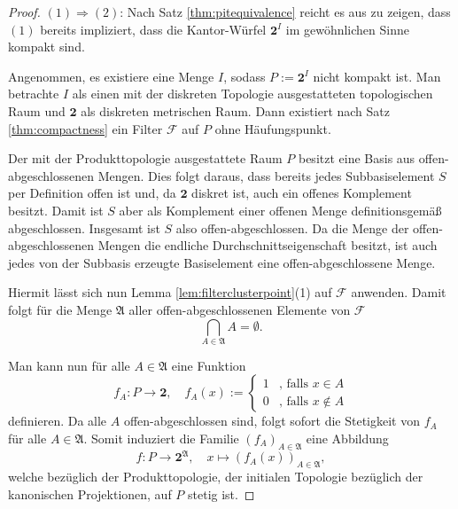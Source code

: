 \begin{proof}
  $(1) \Rightarrow(2) $: Nach Satz \ref{thm:pitequivalence} reicht es aus zu zeigen, dass $(1)$ bereits impliziert, dass die Kantor-Würfel $\mathbf{2}^I$ im gewöhnlichen Sinne kompakt sind.

  Angenommen, es existiere eine Menge $I$, sodass $P:= \mathbf{2}^I$ nicht kompakt ist.
  Man betrachte $I$ als einen mit der diskreten Topologie ausgestatteten topologischen Raum und $\mathbf{2}$ als diskreten metrischen Raum.
  Dann existiert nach Satz \ref{thm:compactness} ein Filter $\mathcal{F}$ auf $P$ ohne Häufungspunkt.

  Der mit der Produkttopologie ausgestattete Raum $P$ besitzt eine Basis aus offen-ab\-ge\-schlossenen Mengen.
  Dies folgt daraus, dass bereits jedes Subbasiselement $S$ per Definition offen ist und, da $\mathbf{2}$ diskret ist, auch ein offenes Komplement besitzt.
  Damit ist $S$ aber als Komplement einer offenen Menge definitionsgemäß abgeschlossen.
  Insgesamt ist $S$ also offen-abgeschlossen.
  Da die Menge der offen-abgeschlossenen Mengen die endliche Durchschnittseigenschaft besitzt, ist auch jedes von der Subbasis erzeugte Basiselement eine offen-abgeschlossene Menge.

  Hiermit lässt sich nun Lemma \ref{lem:filterclusterpoint}(1) auf $\mathcal{F}$ anwenden.
  Damit folgt für die Menge $\mathfrak{A}$ aller offen-abgeschlossenen Elemente von $\mathcal{F}$
  \begin{displaymath}
    \bigcap_{A \in \mathfrak{A}} A = \emptyset \tag{$\ast$}.
  \end{displaymath}

  Man kann nun für alle $A \in \mathfrak{A}$ eine Funktion
  \begin{equation}
    \label{eq:clopenmap}
    f_A \colon P \to \mathbf{2}, \quad
    f_A(x) := 
    \begin{cases}
      1 &\text{, falls } x \in A \\
      0 &\text{, falls } x \not\in A
    \end{cases}
  \end{equation}
  definieren.
  Da alle $A$ offen-abgeschlossen sind, folgt sofort die Stetigkeit von $f_A$ für alle $A \in \mathfrak{A}$.
  Somit induziert die Familie $(f_A)_{A \in \mathfrak{A}}$ eine Abbildung 
  \begin{displaymath}
    f \colon P \to \mathbf{2}^\mathfrak{A}, \quad
    x \mapsto (f_A(x))_{A \in \mathfrak{A}},
  \end{displaymath}
  welche bezüglich der Produkttopologie, der initialen Topologie bezüglich der kanonischen Projektionen, auf $P$ stetig ist.


\end{proof}
